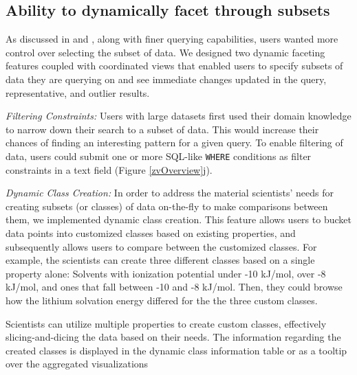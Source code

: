 \subsection{Ability to dynamically facet through subsets}
\par As discussed in \cite{Amar2005} and \cite{Heer2012}, along with finer querying capabilities, users wanted more control over selecting the subset of data. We designed two dynamic faceting features coupled with coordinated views \cite{Heer2012} that enabled users to specify subsets of data they are querying on and see immediate changes updated in the query, representative, and outlier results. 
\par \textit{Filtering Constraints:} Users with large datasets first used their domain knowledge to narrow down their search to a subset of data. This would increase their chances of finding an interesting pattern for a given query. To enable filtering of data, users could submit one or more SQL-like \texttt{WHERE} conditions as filter constraints in a text field (Figure \ref{zvOverview}j).  
\par \textit{Dynamic Class Creation:} In order to address the material scientists' needs for creating subsets (or classes) of data on-the-fly to make comparisons between them, we implemented dynamic class creation. This feature allows users to bucket data points into customized classes based on existing properties, and subsequently allows users to compare between the customized classes. For example, the scientists can create three different classes based on a single property alone: Solvents with ionization potential under -10 kJ/mol, over -8 kJ/mol, and ones that fall between -10 and -8 kJ/mol. Then, they could browse how the lithium solvation energy differed for the the three custom classes. 
\par Scientists can utilize multiple properties to create custom classes, effectively slicing-and-dicing the data based on their needs. The information regarding the created classes is displayed in the dynamic class information table or as a tooltip over the aggregated visualizations
